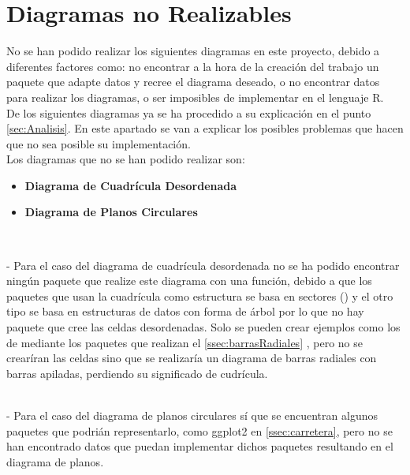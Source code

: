 \documentclass{article}\usepackage[]{graphicx}\usepackage[]{color}
\begin{document}
\section{Diagramas no Realizables}
No se han podido realizar los siguientes diagramas en este proyecto, debido a diferentes factores como: no encontrar a la hora de la creaci\'on del trabajo un paquete que adapte datos y recree el diagrama deseado, o no encontrar datos para realizar los diagramas, o ser imposibles de implementar en el lenguaje R.~\\
De los siguientes diagramas ya se ha procedido a su explicaci\'on en el punto  \ref{sec:Analisis}. En este apartado se van a explicar los posibles problemas que hacen que no sea posible su implementaci\'on.~\\
Los diagramas que no se han podido realizar son:
\begin{itemize}
\item \textbf{Diagrama de Cuadr\'icula Desordenada}
\item \textbf{Diagrama de Planos Circulares}
\end{itemize}~\par
 - Para el caso del diagrama de cuadr\'icula desordenada no se ha podido encontrar ning\'un paquete que realize este diagrama con una funci\'on, debido a que los paquetes que usan la cuadr\'icula como estructura se basa en sectores ()
 y el otro tipo se basa en estructuras de datos con forma de \'arbol por lo que no hay paquete que cree las celdas desordenadas. Solo se pueden crear ejemplos como los de\cite[p\'ag 136]{Circle} mediante los paquetes que realizan el  \ref{ssec:barrasRadiales}
 , pero no se crear\'iran las celdas sino que se realizar\'ia un diagrama de barras radiales con barras apiladas, perdiendo su significado de cudr\'icula.~\\~\par
 - Para el caso del diagrama de planos circulares s\'i que se encuentran algunos paquetes que podri\'an representarlo, como ggplot2 en  \ref{ssec:carretera}, pero no se han encontrado datos que puedan implementar dichos paquetes resultando en el diagrama de planos.~\\~\\~\\
\end{document}
